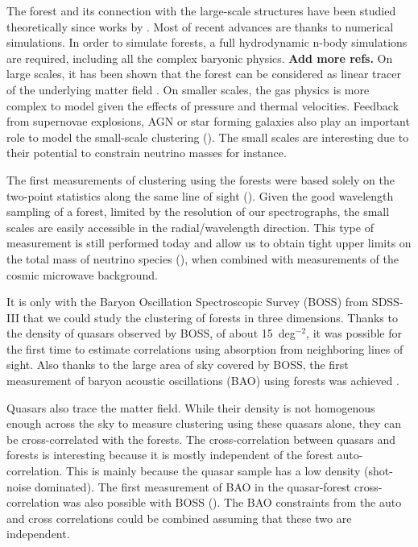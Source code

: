 The \lya forest and its connection with the large-scale structures have been studied 
theoretically since works by \cite{gunnDensityNeutralHydrogen1965}. Most of recent 
advances are thanks to numerical simulations. In order to simulate forests, 
a full hydrodynamic n-body simulations are required, including all the 
complex baryonic physics. \textbf{Add more refs. }
On large scales, it has been shown that the forest can be considered as 
linear tracer of the underlying matter field 
\cite{mcdonaldObservedProbabilityDistribution2000, mcdonaldMeasurementCosmologicalGeometry2003, 
mcdonaldLinearTheoryPower2005}. On smaller scales, the gas physics is more 
complex to model given the effects of pressure and thermal velocities. 
Feedback from supernovae explosions, AGN or star forming galaxies also play 
an important role to model the small-scale clustering (\cite{chabanierImpactAGNFeedback2020}). 
The small scales are 
interesting due to their potential to constrain neutrino masses for instance. 


The first measurements of clustering using the \lya forests 
were based solely on the two-point statistics along the same 
line of sight (\cite{croftPowerSpectrumMass1999, mcdonaldLyAlphaForest2006}). 
Given the good wavelength sampling of a forest, 
limited by the resolution of our spectrographs, the small scales 
are easily accessible in the radial/wavelength direction. 
This type of measurement is still 
performed today and allow us to obtain tight upper limits on 
the total mass of neutrino species (\cite{palanque-delabrouilleHintsNeutrinoBounds2020}), 
when combined with measurements of the cosmic microwave background. 

It is only with the Baryon Oscillation Spectroscopic Survey (BOSS) from SDSS-III 
that we could study the clustering of \lya forests in three dimensions. 
Thanks to the density of quasars observed by BOSS, of about 15~deg$^{-2}$, 
it was possible for the first time to estimate correlations using absorption 
from neighboring lines of sight. Also thanks to the large area of sky covered by 
BOSS, the first measurement of baryon acoustic oscillations (BAO) using forests was achieved 
\cite{buscaBaryonAcousticOscillations2013, slosarMeasurementBaryonAcoustic2013, kirkbyFittingMethodsBaryon2013}.

Quasars also trace the matter field. While their density is not homogenous enough across the sky 
to measure clustering using these quasars alone, they can be cross-correlated with 
the forests. The cross-correlation between quasars and \lya forests is interesting 
because it is mostly independent of the \lya forest auto-correlation. 
This is mainly because the quasar sample has a low density (shot-noise dominated).
The first measurement of BAO in the quasar-forest cross-correlation was also possible with 
BOSS (\cite{font-riberaQuasarLymanAlphaForest2014}). The BAO constraints from 
the auto and cross correlations could be combined assuming that these two are independent. 

